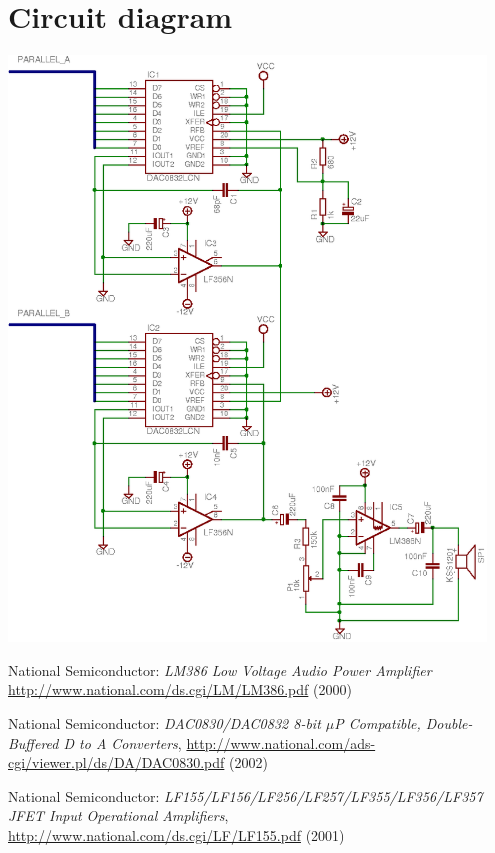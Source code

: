 \documentclass[10pt,twoside,openright]{report}
\newenvironment{nowordcount}{}{}
\begin{document}
\begin{nowordcount}

\chapter{Circuit diagram}
\begin{center}
\label{appendix:circuit_diagram}
\includegraphics[width=0.95\textwidth]{images/output-schematic}
\end{center}

\pagebreak
\begin{thebibliography}{99}

National Semiconductor:
\emph{LM386 Low Voltage Audio Power Amplifier}
\url{http://www.national.com/ds.cgi/LM/LM386.pdf} (2000)

National Semiconductor:
\emph{DAC0830/DAC0832 8-bit $\mu$P Compatible, Double-Buffered D to A Converters}, 
\url{http://www.national.com/ads-cgi/viewer.pl/ds/DA/DAC0830.pdf} (2002)

National Semiconductor:
\emph{LF155/LF156/LF256/LF257/LF355/LF356/LF357 JFET Input Operational Amplifiers},
\url{http://www.national.com/ds.cgi/LF/LF155.pdf} (2001)
\end{thebibliography}

\end{nowordcount}
\end{document}
